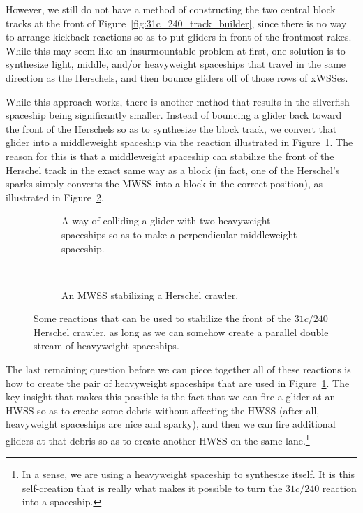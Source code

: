 However, we still do not have a method of constructing the two central block tracks at the front of Figure~\ref{fig:31c_240_track_builder}, since there is no way to arrange kickback reactions so as to put gliders in front of the frontmost rakes. While this may seem like an insurmountable problem at first, one solution is to synthesize light, middle, and/or heavyweight spaceships that travel in the same direction as the Herschels, and then bounce gliders off of those rows of xWSSes.

While this approach works, there is another method that results in the silverfish spaceship being significantly smaller. Instead of bouncing a glider back toward the front of the Herschels so as to synthesize the block track, we convert that glider into a middleweight spaceship via the reaction illustrated in Figure~\ref{fig:g_2h_to_m}. The reason for this is that a middleweight spaceship can stabilize the front of the Herschel track in the exact same way as a block (in fact, one of the Herschel's sparks simply converts the MWSS into a block in the correct position), as illustrated in Figure~\ref{fig:herschel_mwss_stabilize}.

\begin{figure}[!htb]
	\centering
	\begin{subfigure}[b]{0.43\textwidth}
		\centering
		\caption{A way of colliding a glider with two heavyweight spaceships so as to make a perpendicular middleweight spaceship.}\label{fig:g_2h_to_m}
	\end{subfigure} \ \	\ \ \ \begin{subfigure}[b]{0.53\textwidth}
		\centering
		\caption{An MWSS stabilizing a Herschel crawler.}\label{fig:herschel_mwss_stabilize}
	\end{subfigure}
	\caption{Some reactions that can be used to stabilize the front of the $31c/240$ Herschel crawler, as long as we can somehow create a parallel double stream of heavyweight spaceships.}\label{fig:silverfish_mwss_reactions}
\end{figure}

The last remaining question before we can piece together all of these reactions is how to create the pair of heavyweight spaceships that are used in Figure~\ref{fig:g_2h_to_m}. The key insight that makes this possible is the fact that we can fire a glider at an HWSS so as to create some debris without affecting the HWSS (after all, heavyweight spaceships are nice and sparky), and then we can fire additional gliders at that debris so as to create another HWSS on the same lane.\footnote{In a sense, we are using a heavyweight spaceship to synthesize itself. It is this self-creation that is really what makes it possible to turn the $31c/240$ reaction into a spaceship.}


